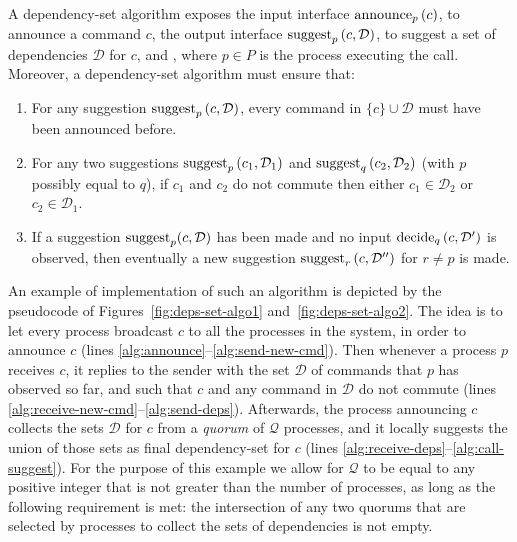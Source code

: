 A dependency-set algorithm exposes the input interface $\operatorname{announce}_p\left( c \right)$, to announce a command $c$, the output interface $\operatorname{suggest}_p \left( c,\mathcal{D}\right)$, to suggest a set of dependencies $\mathcal{D}$ for $c$, and , where $p\in P$ is the process executing the call.
Moreover, a dependency-set algorithm must ensure that:
\begin{enumerate}
    \item For any suggestion $\operatorname{suggest}_p \left( c,\mathcal{D}\right)$, every command in $\{c\}\cup \mathcal{D}$ must have been announced before.
    \item For any two suggestions $\operatorname{suggest}_p \left( c_1,\mathcal{D}_1\right)$ and $\operatorname{suggest}_q \left( c_2,\mathcal{D}_2\right)$ (with $p$ possibly equal to $q$), if $c_1$ and $c_2$ do not commute then either $c_1\in \mathcal{D}_2$ or $c_2 \in \mathcal{D}_1$.
    \item If a suggestion $\operatorname{suggest}_p(c,\mathcal{D})$ has been made and no input $\operatorname{decide}_q\left( c,\mathcal{D'} \right)$ is observed, then eventually a new suggestion $\operatorname{suggest}_r\left( c,\mathcal{D''} \right)$ for $r\neq p$ is made.
\end{enumerate}

An example of implementation of such an algorithm is depicted by the pseudocode of Figures~\ref{fig:deps-set-algo1} and~\ref{fig:deps-set-algo2}. The idea is to let every process broadcast $c$ to all the processes in the system, in order to announce $c$ (lines \ref{alg:announce}--\ref{alg:send-new-cmd}). Then whenever a process $p$ receives $c$, it replies to the sender with the set $\mathcal{D}$ of commands that $p$ has observed so far, and such that $c$ and any command in $\mathcal{D}$ do not commute (lines \ref{alg:receive-new-cmd}--\ref{alg:send-deps}). Afterwards, the process announcing $c$ collects the sets $\mathcal{D}$ for $c$ from a \textit{quorum} of $\mathcal{Q}$ processes, and it locally suggests the union of those sets as final dependency-set for $c$ (lines \ref{alg:receive-deps}--\ref{alg:call-suggest}). For the purpose of this example we allow for $\mathcal{Q}$ to be equal to any positive integer that is not greater than the number of processes, as long as the following requirement is met: the intersection of any two quorums that are selected by processes to collect the sets of dependencies is not empty.

